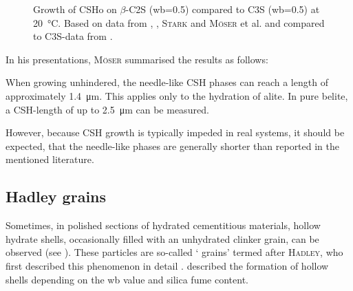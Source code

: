\begin{figure}[!htb]
    \caption{Growth of \ac{CSHo} on $\beta$-\ac{C2S} (\ac{wb}=\num{0.5}) compared to \ac{C3S} (\ac{wb}=\num{0.5}) at \qty{20}{\celsius}. Based on data from \textcite{voland.2000}, \textcite{suss.2001}, \textsc{Stark} and \textsc{Möser} et al. \cite{stark.2001,moser.2002} and compared to \ac{C3S}-data from \textcite{bazzoni.2014}.}
    \label{fig:suess_CSH_C2S}
\end{figure}


In his presentations, \textsc{Möser} summarised the results as follows:
\begin{iquote}
When growing unhindered, the needle-like \ac{CSH} phases can reach a length of approximately \qty{1.4}{\micro\meter}. This applies only to the hydration of alite. In pure belite, a \ac{CSH}-length of up to \qty{2.5}{\micro\meter} can be measured. \cite{moser.2001}
\end{iquote}


However, because \ac{CSH} growth is typically impeded in real systems, it should be expected, that the needle-like phases are generally shorter than reported in the mentioned literature.

\subsection{Hadley grains}
\label{subsec:hadley}

Sometimes, in polished sections of hydrated cementitious materials, hollow hydrate shells, occasionally filled with an unhydrated clinker grain, can be observed (see ).
These particles are so-called `\textcite{hadley.1972} grains' termed after \textsc{Hadley}, who first described this phenomenon in detail \cite{hadley.1972, hadley.2000}.
\textcite{kjellsen.1997} described the formation of hollow shells depending on the \ac{wb} value and silica fume content.


